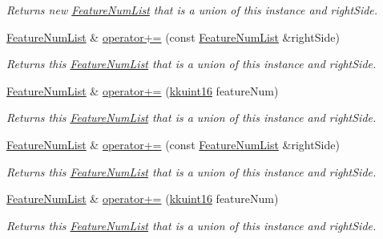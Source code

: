 \begin{DoxyCompactItemize}
\begin{DoxyCompactList}\small\item\em Returns new \hyperlink{class_k_k_m_l_l_1_1_feature_num_list}{Feature\+Num\+List} that is a union of this instance and \textquotesingle{}right\+Side\textquotesingle{}. \end{DoxyCompactList}\item 
\hyperlink{class_k_k_m_l_l_1_1_feature_num_list}{Feature\+Num\+List} \& \hyperlink{class_k_k_m_l_l_1_1_feature_num_list_a33997e57c637469f19954158447c81ee}{operator+=} (const \hyperlink{class_k_k_m_l_l_1_1_feature_num_list}{Feature\+Num\+List} \&right\+Side)
\begin{DoxyCompactList}\small\item\em Returns this \hyperlink{class_k_k_m_l_l_1_1_feature_num_list}{Feature\+Num\+List} that is a union of this instance and \textquotesingle{}right\+Side\textquotesingle{}. \end{DoxyCompactList}\item 
\hyperlink{class_k_k_m_l_l_1_1_feature_num_list}{Feature\+Num\+List} \& \hyperlink{class_k_k_m_l_l_1_1_feature_num_list_a7cb002180dffe5edc6569a9520bcc5d8}{operator+=} (\hyperlink{namespace_k_k_b_aa8c7d4d30381c8a0b6fce68974a9c8a9}{kkuint16} feature\+Num)
\begin{DoxyCompactList}\small\item\em Returns this \hyperlink{class_k_k_m_l_l_1_1_feature_num_list}{Feature\+Num\+List} that is a union of this instance and \textquotesingle{}right\+Side\textquotesingle{}. \end{DoxyCompactList}\item 
\hyperlink{class_k_k_m_l_l_1_1_feature_num_list}{Feature\+Num\+List} \& \hyperlink{class_k_k_m_l_l_1_1_feature_num_list_a4015053c460a713821efc22b7a886b83}{operator+=} (const \hyperlink{class_k_k_m_l_l_1_1_feature_num_list}{Feature\+Num\+List} \&right\+Side)
\begin{DoxyCompactList}\small\item\em Returns this \hyperlink{class_k_k_m_l_l_1_1_feature_num_list}{Feature\+Num\+List} that is a union of this instance and \textquotesingle{}right\+Side\textquotesingle{}. \end{DoxyCompactList}\item 
\hyperlink{class_k_k_m_l_l_1_1_feature_num_list}{Feature\+Num\+List} \& \hyperlink{class_k_k_m_l_l_1_1_feature_num_list_a21ec2348cfbecdc58e79983dd8431591}{operator+=} (\hyperlink{namespace_k_k_b_aa8c7d4d30381c8a0b6fce68974a9c8a9}{kkuint16} feature\+Num)
\begin{DoxyCompactList}\small\item\em Returns this \hyperlink{class_k_k_m_l_l_1_1_feature_num_list}{Feature\+Num\+List} that is a union of this instance and \textquotesingle{}right\+Side\textquotesingle{}. \end{DoxyCompactList}\item 

\end{DoxyCompactItemize}
